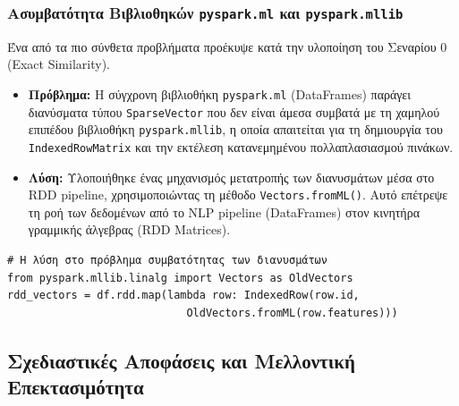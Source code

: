 \documentclass[a4paper,12pt]{article}
\begin{document}
\subsubsection{Ασυμβατότητα Βιβλιοθηκών \texttt{pyspark.ml} και \texttt{pyspark.mllib}} 

Ένα από τα πιο σύνθετα προβλήματα προέκυψε κατά την υλοποίηση του Σεναρίου 0 (Exact Similarity). 
\begin{itemize} 
    \item \textbf{Πρόβλημα:} Η σύγχρονη βιβλιοθήκη \texttt{pyspark.ml} (DataFrames) παράγει διανύσματα τύπου \texttt{SparseVector} που δεν είναι άμεσα συμβατά με τη χαμηλού επιπέδου βιβλιοθήκη \texttt{pyspark.mllib}, η οποία απαιτείται για τη δημιουργία του \texttt{IndexedRowMatrix} και την εκτέλεση κατανεμημένου πολλαπλασιασμού πινάκων. 
    
    \item \textbf{Λύση:} Υλοποιήθηκε ένας μηχανισμός μετατροπής των διανυσμάτων μέσα στο RDD pipeline, χρησιμοποιώντας τη μέθοδο \texttt{Vectors.fromML()}. Αυτό επέτρεψε τη ροή των δεδομένων από το NLP pipeline (DataFrames) στον κινητήρα γραμμικής άλγεβρας (RDD Matrices). 
\end{itemize}

\begin{verbatim}
# Η λύση στο πρόβλημα συμβατότητας των διανυσμάτων
from pyspark.mllib.linalg import Vectors as OldVectors
rdd_vectors = df.rdd.map(lambda row: IndexedRow(row.id,
                            OldVectors.fromML(row.features)))
\end{verbatim}

\subsection{Σχεδιαστικές Αποφάσεις και Μελλοντική Επεκτασιμότητα}
\end{document}

